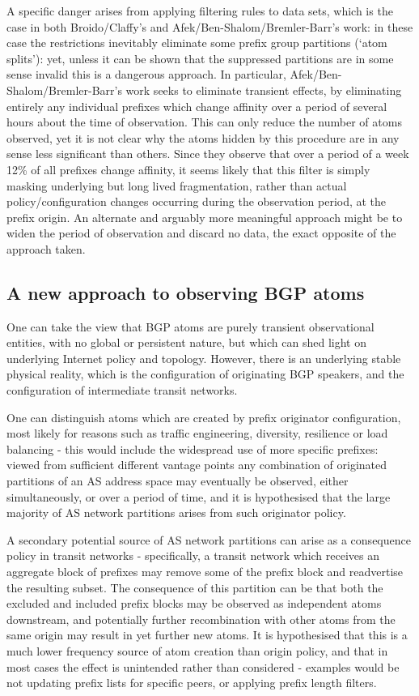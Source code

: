 A specific danger arises from applying filtering rules to data sets, which is the case in both Broido/Claffy's and Afek/Ben-Shalom/Bremler-Barr's work: in these case the restrictions inevitably eliminate some prefix group partitions (`atom splits'): yet, unless it can be shown that the suppressed partitions are in some sense invalid this is a dangerous approach. In particular, Afek/Ben-Shalom/Bremler-Barr's work seeks to eliminate transient effects, by eliminating entirely any individual prefixes which change affinity over a period of several hours about the time of observation. This can only reduce the number of atoms observed, yet it is not clear why the atoms hidden by this procedure are in any sense less significant than others. Since they observe that over a period of a week 12\% of all prefixes change affinity, it seems likely that this filter is simply masking underlying but long lived fragmentation, rather than actual policy/configuration changes occurring during the observation period, at the prefix origin. An alternate and arguably more meaningful approach might be to widen the period of observation and discard no data, the exact opposite of the approach taken.

\subsection{A new approach to observing BGP atoms}

One can take the view that BGP atoms are purely transient observational entities, with no global or persistent nature, but which can shed light on underlying Internet policy and topology. However, there is an underlying stable physical reality, which is the configuration of originating BGP speakers, and the configuration of intermediate transit networks.

One can distinguish atoms which are created by prefix originator configuration, most likely for reasons such as traffic engineering, diversity, resilience or load balancing - this would include the widespread use of more specific prefixes: viewed from sufficient different vantage points any combination of originated partitions of an AS address space may eventually be observed, either simultaneously, or over a period of time, and it is hypothesised that the large majority of AS network partitions arises from such originator policy.

A secondary potential source of AS network partitions can arise as a consequence policy in transit networks - specifically, a transit network which receives an aggregate block of prefixes may remove some of the prefix block and readvertise the resulting subset. The consequence of this partition can be that both the excluded and included prefix blocks may be observed as independent atoms downstream, and potentially further recombination with other atoms from the same origin may result in yet further new atoms. It is hypothesised that this is a much lower frequency source of atom creation than origin policy, and that in most cases the effect is unintended rather than considered - examples would be not updating prefix lists for specific peers, or applying prefix length filters.


